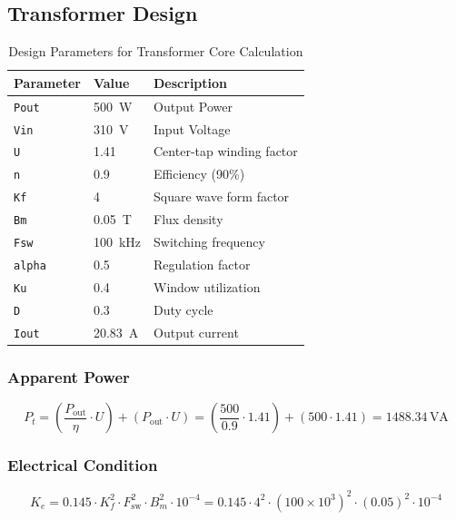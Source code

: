 \subsection{Transformer Design}
\begin{table}[h]
\centering
\caption{Design Parameters for Transformer Core Calculation}
\label{tab:parameters}
\begin{tabular}{lll}
\toprule
\textbf{Parameter} & \textbf{Value} & \textbf{Description} \\
\midrule
\texttt{Pout} & \SI{500}{\watt} & Output Power \\
\texttt{Vin} & \SI{310}{\volt} & Input Voltage \\
\texttt{U} & 1.41 & Center-tap winding factor \\
\texttt{n} & 0.9 & Efficiency (90\%) \\
\texttt{Kf} & 4 & Square wave form factor \\
\texttt{Bm} & \SI{0.05}{\tesla} & Flux density \\
\texttt{Fsw} & \SI{100}{\kilo\hertz} & Switching frequency \\
\texttt{alpha} & 0.5 & Regulation factor \\
\texttt{Ku} & 0.4 & Window utilization \\
\texttt{D} & 0.3 & Duty cycle \\
\texttt{Iout} & \SI{20.83}{\ampere} & Output current \\
\bottomrule
\end{tabular}
\end{table}

\subsubsection*{Apparent Power}
\begin{equation}
    P_t = \left( \frac{P_{\text{out}}}{\eta} \cdot U \right) + \left( P_{\text{out}} \cdot U \right) 
= \left( \frac{500}{0.9} \cdot 1.41 \right) + \left( 500 \cdot 1.41 \right) = \boxed{1488.34\,\text{VA}}
\end{equation}

\subsubsection*{Electrical Condition}
\begin{equation}
    K_e = 0.145 \cdot K_f^2 \cdot F_{\text{sw}}^2 \cdot B_m^2 \cdot 10^{-4} 
= 0.145 \cdot 4^2 \cdot (100 \times 10^3)^2 \cdot (0.05)^2 \cdot 10^{-4}
\end{equation}

